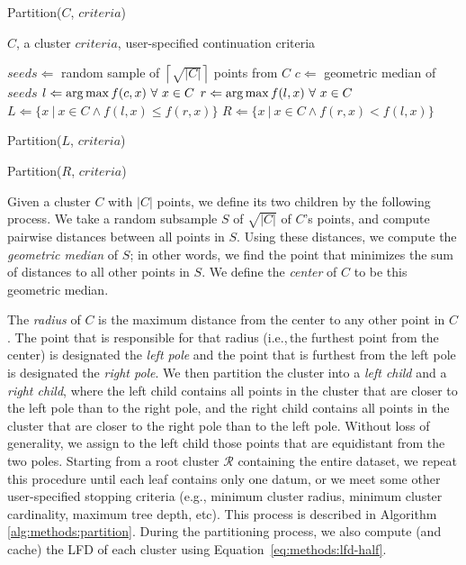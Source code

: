 \begin{algorithm} %
    \caption{Partition($C$, $criteria$)} %
    \label{alg:methods:partition} %
    \begin{algorithmic} %
        \Require $C$, a cluster
        \Require $criteria$, user-specified continuation criteria

        \State $seeds \Leftarrow$ random sample of $\left\lceil \sqrt{|C|} \right\rceil$ points from $C$
        \State $c \Leftarrow$ geometric median of $seeds$
        \State $l \Leftarrow \operatorname*{arg\,max} f(c, x) \ \forall \ x \in C$
        \State $r \Leftarrow \argmax f(l, x) \ \forall \ x \in C$
        \State $L \Leftarrow \{x \ | \ x \in C \land f(l, x) \le f(r, x)\}$
        \State $R \Leftarrow \{x \ | \ x \in C \land f(r, x) < f(l, x)\}$

            \State Partition($L$, $criteria$)
        \EndIf

            \State Partition($R$, $criteria$)
        \EndIf
    \end{algorithmic}
\end{algorithm}

Given a cluster $C$ with $|C|$ points, we define its two children by the following process. We take a random subsample $S$ of $\sqrt{|C|}$ of $C$'s points, and compute pairwise distances between all points in $S$.
Using these distances, we compute the \textit{geometric median} of $S$; in other words, we find the point that minimizes the sum of distances to all other points in $S$.
We define the \textit{center} of $C$ to be this geometric median.

The \textit{radius} of $C$ is the maximum distance from the center to any other point in $C$.
The point that is responsible for that radius (i.e.,\,the furthest point from the center) is designated the \textit{left pole} and the point that is furthest from the left pole is designated the \textit{right pole}.
We then partition the cluster into a \textit{left child} and a \textit{right child}, where the left child contains all points in the cluster that are closer to the left pole than to the right pole, and the right child contains all points in the cluster that are closer to the right pole than to the left pole.
Without loss of generality, we assign to the left child those points that are equidistant from the two poles.
Starting from a root cluster $\mathcal{R}$ containing the entire dataset, we repeat this procedure until each leaf contains only one datum, or we meet some other user-specified stopping criteria (e.g., minimum cluster radius, minimum cluster cardinality, maximum tree depth, etc).
This process is described in Algorithm \ref{alg:methods:partition}.
During the partitioning process, we also compute (and cache) the LFD of each cluster using Equation~\ref{eq:methods:lfd-half}.


